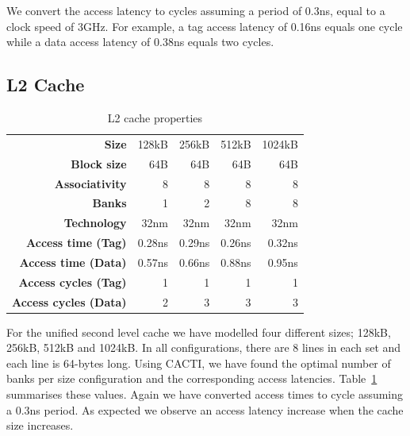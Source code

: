 We convert the access latency to cycles assuming a period of 0.3ns, equal to a clock speed of 3GHz.
For example, a tag access latency of 0.16ns equals one cycle while a data access latency of 0.38ns equals two cycles.
\subsection{L2 Cache}
\begin{table}[ht]
\centering
\begin{tabular}{rrrrr}
\toprule
\bf{Size}                 & 128kB       & 256kB       & 512kB       & 1024kB            \\
\bf{Block size}           & 64B         & 64B         & 64B         & 64B               \\
\bf{Associativity}        & 8           & 8           & 8           & 8                 \\
\bf{Banks}                & 1           & 2           & 8           & 8                 \\
\bf{Technology}           & 32nm        & 32nm        & 32nm        & 32nm              \\
\bf{Access time (Tag)}    & 0.28ns      & 0.29ns      & 0.26ns      & 0.32ns            \\
\bf{Access time (Data)}   & 0.57ns      & 0.66ns      & 0.88ns      & 0.95ns            \\
\bf{Access cycles (Tag)}  & 1           & 1           & 1           & 1                 \\
\bf{Access cycles (Data)} & 2           & 3           & 3           & 3                 \\
\bottomrule
\end{tabular}
\caption{L2 cache properties}
\label{tbl:processor_model:l2}
\end{table}

For the unified second level cache we have modelled four different sizes; 128kB, 256kB, 512kB and 1024kB. 
In all configurations, there are 8 lines in each set and each line is 64-bytes long.
Using CACTI, we have found the optimal number of banks per size configuration and the corresponding access latencies.
Table~\ref{tbl:processor_model:l2} summarises these values. 
Again we have converted access times to cycle assuming a 0.3ns period.
As expected we observe an access latency increase when the cache size increases.

